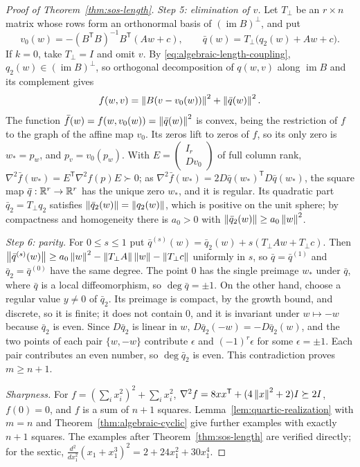 \begin{proof}[Proof of Theorem~\ref{thm:sos-length}]
\emph{Step 5: elimination of $v$.} Let $T_\perp$ be an $r\times n$ matrix whose
rows form an orthonormal basis of $(\operatorname{im}B)^\perp$, and put
\[
 v_0(w)=-(B^{\mathsf T}B)^{-1}B^{\mathsf T}(Aw+c),\qquad
 \bar q(w)=T_\perp\bigl(q_2(w)+Aw+c\bigr).
\]
If $k=0$, take $T_\perp=I$ and omit $v$. By
\eqref{eq:algebraic-length-coupling}, $q_2(w)\in(\operatorname{im}B)^\perp$, so
orthogonal decomposition of $q(w,v)$ along $\operatorname{im}B$ and its
complement gives
\[
 f(w,v)=\left\lVert B(v-v_0(w))\right\rVert^2+\left\lVert\bar q(w)\right\rVert^2 .
\]
The function $\bar f(w)=f(w,v_0(w))=\left\lVert\bar q(w)\right\rVert^2$ is convex, being the
restriction of $f$ to the graph of the affine map $v_0$. Its zeros lift to
zeros of $f$, so its only zero is $w_*=p_w$, and $p_v=v_0(p_w)$. With
$E=\left(\begin{smallmatrix}I_r\\Dv_0\end{smallmatrix}\right)$ of full column
rank, $\nabla^2\bar f(w_*)=E^{\mathsf T}\nabla^2f(p)E\succ0$; as
$\nabla^2\bar f(w_*)=2D\bar q(w_*)^{\mathsf T}D\bar q(w_*)$, the square map
$\bar q:\mathbb R^r\to\mathbb R^r$ has the unique zero $w_*$, and it is regular. Its
quadratic part $\bar q_2=T_\perp q_2$ satisfies
$\left\lVert\bar q_2(w)\right\rVert=\left\lVert q_2(w)\right\rVert$, which is positive on the unit sphere; by
compactness and homogeneity there is $a_0>0$ with
$\left\lVert\bar q_2(w)\right\rVert\ge a_0\left\lVert w\right\rVert^2$.

\emph{Step 6: parity.} For $0\le s\le1$ put
$\bar q^{(s)}(w)=\bar q_2(w)+s(T_\perp Aw+T_\perp c)$. Then
$\left\lVert\bar q^{(s)}(w)\right\rVert\ge a_0\left\lVert w\right\rVert^2-\left\lVert T_\perp A\right\rVert\left\lVert w\right\rVert-\left\lVert T_\perp c\right\rVert$
uniformly in $s$, so $\bar q=\bar q^{(1)}$ and $\bar q_2=\bar q^{(0)}$ have
the same degree. The point $0$ has the single preimage $w_*$ under $\bar q$,
where $\bar q$ is a local diffeomorphism, so $\deg\bar q=\pm1$. On the other
hand, choose a regular value $y\ne0$ of $\bar q_2$. Its preimage is compact,
by the growth bound, and discrete, so it is finite; it does not contain $0$,
and it is invariant under $w\mapsto-w$ because $\bar q_2$ is even. Since
$D\bar q_2$ is linear in $w$, $D\bar q_2(-w)=-D\bar q_2(w)$, and the two
points of each pair $\{w,-w\}$ contribute $\epsilon$ and $(-1)^r\epsilon$ for
some $\epsilon=\pm1$. Each pair contributes an even number, so
$\deg\bar q_2$ is even. This contradiction proves $m\ge n+1$.

\emph{Sharpness.} For $f=(\sum_ix_i^2)^2+\sum_ix_i^2$,
$\nabla^2f=8xx^{\mathsf T}+(4\left\lVert x\right\rVert^2+2)I\succeq2I$, $f(0)=0$, and $f$ is a sum
of $n+1$ squares. Lemma~\ref{lem:quartic-realization} with $m=n$ and
Theorem~\ref{thm:algebraic-cyclic} give further examples with exactly $n+1$
squares. The examples after Theorem~\ref{thm:sos-length} are verified
directly; for the sextic,
$\frac{d^2}{dx_1^2}(x_1+x_1^3)^2=2+24x_1^2+30x_1^4$.
\end{proof}

